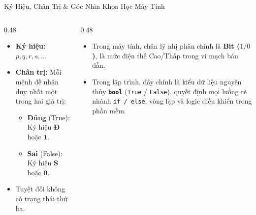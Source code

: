 \documentclass[aspectratio=169, 10pt]{beamer}
\begin{document}
\begin{frame}{Ký Hiệu, Chân Trị \& Góc Nhìn Khoa Học Máy Tính}
  \begin{columns}[t, onlytextwidth]
    \begin{column}{0.48\textwidth}
      \begin{cozyDef}
        \small
        \begin{itemize}
          \item \textbf{Ký hiệu:} $p, q, r, s, \dots$
          \item \textbf{Chân trị:} Mỗi mệnh đề nhận duy nhất một trong hai giá trị:
          \begin{itemize}
            \item \textbf{Đúng} (True): Ký hiệu \textbf{Đ} hoặc $\mathbf{1}$.
            \item \textbf{Sai} (False): Ký hiệu \textbf{S} hoặc $\mathbf{0}$.
          \end{itemize}
          \item Tuyệt đối không có trạng thái thứ ba.
        \end{itemize}
      \end{cozyDef}
    \end{column}
    \begin{column}{0.48\textwidth}
      \begin{cozyInsight}
        \small
        \begin{itemize}
          \item Trong máy tính, chân lý nhị phân chính là \textbf{Bit ($1 / 0$)}, là mức điện thế Cao/Thấp trong vi mạch bán dẫn.
          \item Trong lập trình, đây chính là kiểu dữ liệu nguyên thủy \textbf{\texttt{bool}} (\texttt{True} / \texttt{False}), quyết định mọi luồng rẽ nhánh \texttt{if / else}, vòng lặp và logic điều khiển trong phần mềm.
        \end{itemize}
      \end{cozyInsight}
    \end{column}
  \end{columns}
\end{frame}
\end{document}
